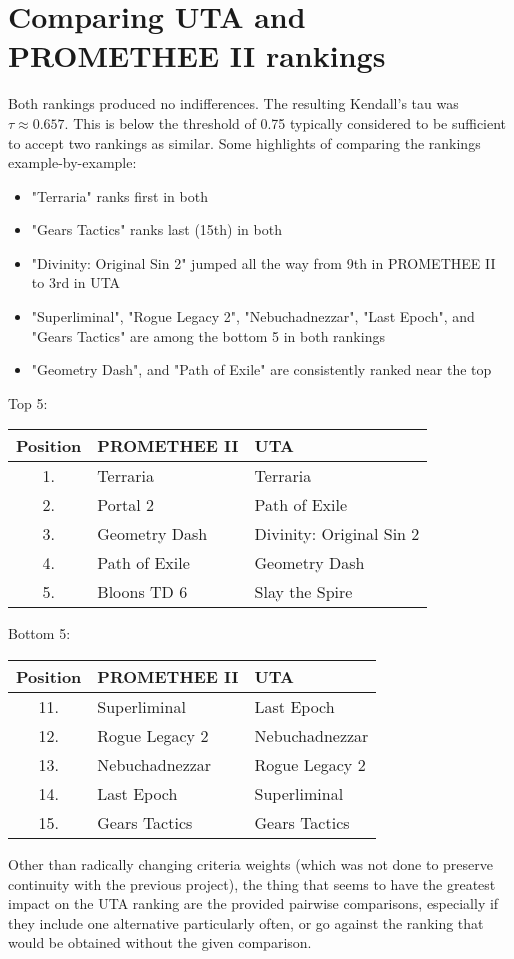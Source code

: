 \documentclass{article}
\begin{document}
\section{Comparing UTA and PROMETHEE II rankings}

Both rankings produced no indifferences.
The resulting Kendall's tau was $ \tau \approx 0.657 $.
This is below the threshold of 0.75 typically considered to be sufficient to accept two rankings as similar. Some highlights of comparing the rankings example-by-example:

\begin{itemize}
    \item "Terraria" ranks first in both
    \item "Gears Tactics" ranks last (15th) in both
    \item "Divinity: Original Sin 2" jumped all the way from 9th  in PROMETHEE II to 3rd in UTA
    \item "Superliminal", "Rogue Legacy 2", "Nebuchadnezzar", "Last Epoch", and "Gears Tactics" are among the bottom 5 in both rankings
    \item "Geometry Dash", and "Path of Exile" are consistently ranked near the top
\end{itemize}

Top 5:
\begin{center}
\begin{tabular}{ c|m{8em}|m{12em} }
    Position & PROMETHEE II & UTA \\
    \hline
    \hline
    1. & Terraria & Terraria \\
    2. & Portal 2 & Path of Exile \\
    3. & Geometry Dash & Divinity: Original Sin 2 \\
    4. & Path of Exile & Geometry Dash \\
    5. & Bloons TD 6 & Slay the Spire \\
\end{tabular}
\end{center}

Bottom 5:
\begin{center}
\begin{tabular}{ c|m{8em}|m{8em} }
    Position & PROMETHEE II & UTA \\
    \hline
    \hline
    11. & Superliminal & Last Epoch  \\
    12. & Rogue Legacy 2 & Nebuchadnezzar  \\
    13. & Nebuchadnezzar & Rogue Legacy 2 \\
    14. & Last Epoch & Superliminal \\
    15. & Gears Tactics & Gears Tactics \\

\end{tabular}
\end{center}

Other than radically changing criteria weights (which was not done to preserve continuity with the previous project), the thing that seems to have the greatest impact on the UTA ranking are the provided pairwise comparisons, especially if they include one alternative particularly often, or go against the ranking that would be obtained without the given comparison.
\end{document}
